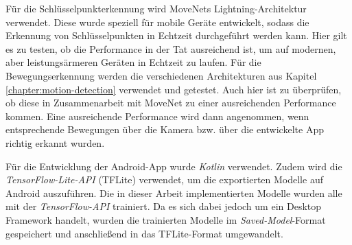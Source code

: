Für die Schlüsselpunkterkennung wird MoveNets Lightning-Architektur
\cite{movenet} verwendet. Diese wurde speziell für mobile Geräte entwickelt,
sodass die Erkennung von Schlüs\-sel\-punk\-ten in Echtzeit durchgeführt werden
kann. Hier gilt es zu testen, ob die Performance in der Tat ausreichend ist, um
auf modernen, aber leistungsärmeren Geräten in Echtzeit zu laufen. Für die
Bewegungserkennung werden die verschiedenen Architekturen aus Kapitel
\ref{chapter:motion-detection} verwendet und getestet. Auch hier ist zu
überprüfen, ob diese in Zusammenarbeit mit MoveNet zu einer ausreichenden
Performance kommen. Eine ausreichende Performance wird dann angenommen, wenn
entsprechende Bewegungen über die Kamera bzw. über die entwickelte App richtig
erkannt wurden.

Für die Entwicklung der Android-App wurde \textit{Kotlin} verwendet. Zudem wird
die \textit{Ten\-sor\-Flow-Lite-API} (TFLite) verwendet, um die exportierten
Modelle auf Android auszuführen. Die in dieser Arbeit implementierten Modelle
wurden alle mit der \textit{TensorFlow-API} trainiert.  Da es sich dabei jedoch
um ein Desktop Framework handelt, wurden die trainierten Modelle im
\textit{Saved-Model}-Format gespeichert und anschließend in das TFLite-Format
umgewandelt. 

